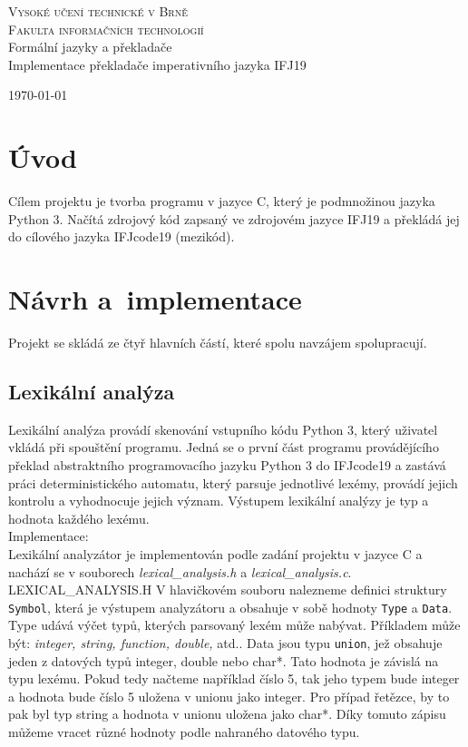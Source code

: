 \documentclass[a4paper,11pt]{article}
\begin{document}
	\begin{titlepage}
		\begin{center} \Huge \textsc{Vysoké učení technické v Brně \\ \huge Fakulta informačních technologií\\} 
			 \LARGE Formální jazyky a překladače \\ \Huge Implementace překladače imperativního jazyka IFJ19  
			
			\end{center}	

		{\LARGE \today}
	\end{titlepage}
	\newpage
	\tableofcontents
    \newpage


\section{Úvod}
Cílem projektu je tvorba programu v jazyce C, který  je podmnožinou jazyka Python 3. Načítá zdrojový kód zapsaný ve zdrojovém jazyce IFJ19 a překládá jej do cílového jazyka IFJcode19 (mezikód).

\section{Návrh a~implementace}
Projekt se skládá ze čtyř hlavních částí, které spolu navzájem spolupracují.

\subsection{Lexikální analýza}
Lexikální analýza provádí skenování vstupního kódu Python 3, který uživatel vkládá při spouštění programu. Jedná se o první část programu provádějícího překlad abstraktního programovacího jazyku Python 3 do IFJcode19 a zastává práci deterministického automatu, který parsuje jednotlivé lexémy, provádí jejich kontrolu a vyhodnocuje jejich význam. Výstupem lexikální analýzy je typ a hodnota každého lexému.
\\
Implementace:\\
Lexikální analyzátor je implementován podle zadání projektu v jazyce C a nachází se v souborech \textit{lexical_analysis.h} a \textit{lexical_analysis.c}. 
\\
LEXICAL_ANALYSIS.H
V hlavičkovém souboru nalezneme definici struktury \texttt{Symbol}, která je výstupem analyzátoru a obsahuje v sobě hodnoty \texttt{Type} a \texttt{Data}. 
Type udává výčet typů, kterých parsovaný lexém může nabývat. Příkladem může být: \textit{integer, string, function, double,} atd..
Data jsou typu \texttt{union}, jež obsahuje jeden z datových typů integer, double nebo char*. Tato hodnota je závislá na typu lexému. Pokud tedy načteme například číslo 5, tak jeho typem bude integer a hodnota bude číslo 5 uložena v unionu jako integer. Pro případ řetězce, by to pak byl typ string a hodnota v unionu uložena jako char*. Díky tomuto zápisu můžeme vracet různé hodnoty podle nahraného datového typu. \\
\end{document}
